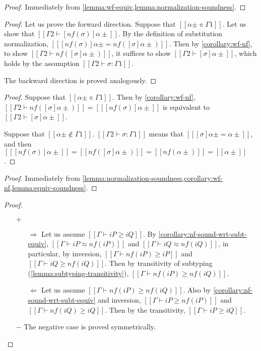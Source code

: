 \corollaryWfNf*
\begin{proof}
  Immediately from \cref{lemma:wf-equiv,lemma:normalization-soundness}.
\end{proof}

\corollaryWfSNf*
\begin{proof}
  Let us prove the forward direction.
  Suppose that $[[α± ∊ Γ1]]$.  Let us show that $[[Γ2 ⊢ [nf(σ)]α±]]$.
  By the definition of substitution normalization,
  $[[ [nf(σ)]α± = nf([σ]α±) ]]$. Then by \cref{corollary:wf-nf},
  to show $[[Γ2 ⊢ nf([σ]α±)]]$, it suffices to show $[[Γ2 ⊢ [σ]α±]]$,
  which holds by the assumption $[[Γ2 ⊢ σ : Γ1]]$.

  The backward direction is proved analogously.
\end{proof}

\lemmaNormSubstSig*
\begin{proof}
  Suppose that $[[α± ∊ Γ1]]$. 
  Then by \cref{corollary:wf-nf}, $[[Γ2 ⊢ nf([σ]α±)]] = [[ [nf(σ)]α± ]]$ 
  is equivalent to $[[Γ2 ⊢ [σ]α±]]$.

  Suppose that $[[α± ∉ Γ1]]$. 
  $[[Γ2 ⊢ σ : Γ1]]$ means that $[[ [σ]α± = α± ]]$, 
  and then $[[ [nf(σ)]α± ]] = [[nf([σ]α±)]] = [[nf(α±)]] = [[α±]]$.
\end{proof}

\corollaryNfSoundWrtSubtEquiv*
\begin{proof}
  Immediately from \cref{lemma:normalization-soundness,corollary:wf-nf,lemma:equiv-soundness}.  
\end{proof}

\corollaryNfPresSubt*
\begin{proof}
  \hfill
  \begin{itemize}
    \item [$+$]  
    \begin{itemize}
      \item [$\Rightarrow$] Let us assume $[[Γ ⊢ iP ≥ iQ]]$.
        By \cref{corollary:nf-sound-wrt-subt-equiv},
        $[[Γ ⊢ iP ≈ nf(iP)]]$ and $[[Γ ⊢ iQ ≈ nf(iQ)]]$, 
        in particular, by inversion, 
        $[[Γ ⊢ nf(iP) ≥ iP]]$ and $[[Γ ⊢ iQ ≥ nf(iQ)]]$.
        Then by transitivity of subtyping 
        (\cref{lemma:subtyping-transitivity}), 
        $[[Γ ⊢ nf(iP) ≥ nf(iQ)]]$.
      \item [$\Leftarrow$] Let us assume $[[Γ ⊢ nf(iP) ≥ nf(iQ)]]$.
        Also by \cref{corollary:nf-sound-wrt-subt-equiv}
        and inversion, 
        $[[Γ ⊢ iP ≥ nf(iP)]]$ and $[[Γ ⊢ nf(iQ) ≥ iQ]]$.
        Then by the transitivity, $[[Γ ⊢ iP ≥ iQ]]$.
    \end{itemize}
    \item [$-$] The negative case is proved symmetrically.
  \end{itemize}
\end{proof}

